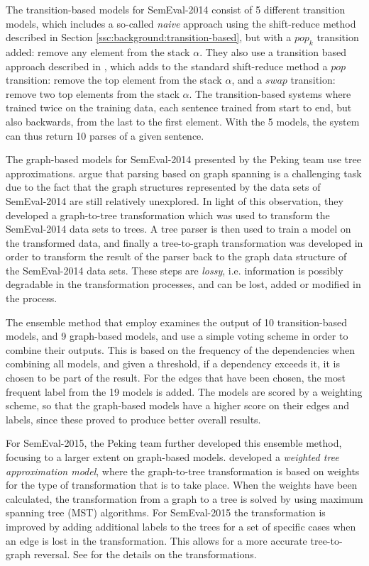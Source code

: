 The transition-based models for SemEval-2014 consist of 5 different transition models, which includes a so-called \textit{naive} approach using the shift-reduce method described in Section \ref{ssc:background:transition-based}, but with a $pop_k$ transition added: remove any element from the stack $\alpha$. They also use a transition based approach described in \cite{Titov:09}, which adds to the standard shift-reduce method a $pop$ transition: remove the top element from the stack $\alpha$, and a $swap$ transition: remove two top elements from the stack $\alpha$. The transition-based systems where trained twice on the training data, each sentence trained from start to end, but also backwards, from the last to the first element. With the 5 models, the system can thus return 10 parses of a given sentence.

The graph-based models for SemEval-2014 presented by the Peking team use tree approximations.  argue that parsing based on graph spanning is a challenging task due to the fact that the graph structures represented by the data sets of SemEval-2014 are still relatively unexplored. In light of this observation, they developed a graph-to-tree transformation which was used to transform the SemEval-2014 data sets to trees. A tree parser is then used to train a model on the transformed data, and finally a tree-to-graph transformation was developed in order to transform the result of the parser back to the graph data structure of the SemEval-2014 data sets. These steps are \textit{lossy}, i.e. information is possibly degradable in the transformation processes, and can be lost, added or modified in the process.

The ensemble method that  employ examines the output of 10 transition-based models, and 9 graph-based models, and use a simple voting scheme in order to combine their outputs. This is based on the frequency of the dependencies when combining all models, and given a threshold, if a dependency exceeds it, it is chosen to be part of the result. For the edges that have been chosen, the most frequent label from the 19 models is added. The models are scored by a weighting scheme, so that the graph-based models have a higher score on their edges and labels, since these proved to produce better overall results.

For SemEval-2015, the Peking team further developed this ensemble method, focusing to a larger extent on graph-based models.  developed a \textit{weighted tree approximation model}, where the graph-to-tree transformation is based on weights for the type of transformation that is to take place. When the weights have been calculated, the transformation from a graph to a tree is solved by using maximum spanning tree (MST) algorithms. For SemEval-2015 the transformation is improved by adding additional labels to the trees for a set of specific cases when an edge is lost in the transformation. This allows for a more accurate tree-to-graph reversal. See \cite{Du:Peking:15} for the details on the transformations.

